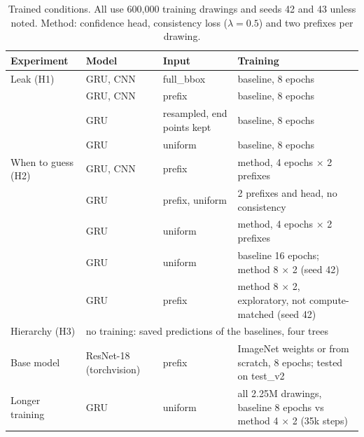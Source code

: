 \begin{table}[t]
\centering
\caption{Trained conditions. All use 600{,}000 training drawings and seeds 42 and 43 unless
noted. Method: confidence head, consistency loss ($\lambda = 0.5$) and two prefixes per drawing.}
\label{tab:matrix}
\setlength{\tabcolsep}{3pt}
\begin{tabular}{p{2.2cm}p{1.3cm}p{2.3cm}p{5.4cm}}
\toprule
Experiment & Model & Input & Training \\
\midrule
Leak (H1) & GRU, CNN & full\_bbox & baseline, 8 epochs \\
& GRU, CNN & prefix & baseline, 8 epochs \\
& GRU & resampled, end points kept & baseline, 8 epochs \\
& GRU & uniform & baseline, 8 epochs \\
\midrule
When to guess (H2) & GRU, CNN & prefix & method, 4 epochs $\times$ 2 prefixes \\
& GRU & prefix, uniform & 2 prefixes and head, no consistency \\
& GRU & uniform & method, 4 epochs $\times$ 2 prefixes \\
& GRU & uniform & baseline 16 epochs; method 8 $\times$ 2 (seed 42) \\
& GRU & prefix & method 8 $\times$ 2, exploratory, not compute-matched (seed 42) \\
\midrule
Hierarchy (H3) & \multicolumn{3}{p{9.4cm}}{no training: saved predictions of the baselines, four trees} \\
\midrule
Base model & ResNet-18 (torchvision) & prefix & ImageNet weights or from scratch, 8 epochs; tested on test\_v2 \\
\midrule
Longer training & GRU & uniform & all 2.25M drawings, baseline 8 epochs vs method 4 $\times$ 2 (35k steps) \\
\bottomrule
\end{tabular}
\end{table}
